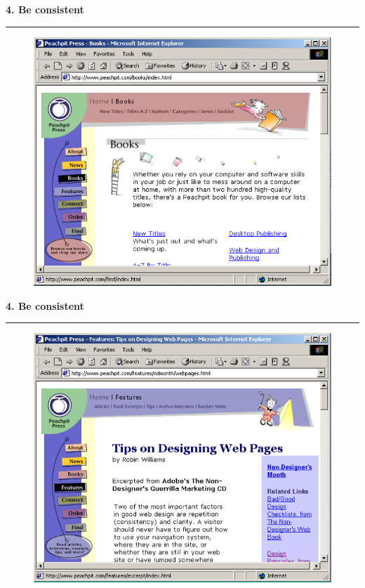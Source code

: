 \documentclass[pdf]{beamer}
\begin{document}
\begin{frame}
{\textbf{4. Be consistent}}{\textcolor{red}{\rule{12cm}{1.2pt}}}

	\begin{figure}
		\includegraphics[scale=0.55]{22_picture.png}
  	\end{figure}
\end{frame}



\begin{frame}
{\textbf{4. Be consistent}}{\textcolor{red}{\rule{12cm}{1.2pt}}}

	\begin{figure}
		\includegraphics[scale=0.55]{23_picture.png}
  	\end{figure}
\end{frame}
\end{document}
